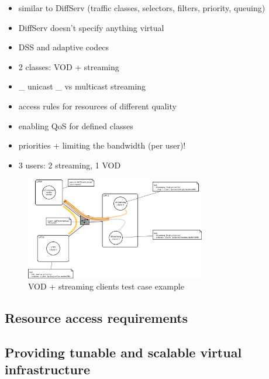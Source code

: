 \documentclass[11pt]{book}
\begin{document}
        \begin{itemize}
          \item similar to DiffServ (traffic classes, selectors, filters, priority, queuing)
          \item DiffServ doesn't specify anything virtual
          \item DSS and adaptive codecs
        \end{itemize}

        \begin{itemize}
          \item 2 classes: VOD + streaming
          \item \_ unicast \_ vs multicast streaming
          \item access rules for resources of different quality
          \item enabling QoS for defined classes
          \item priorities + limiting the bandwidth (per user)!
          \item 3 users: 2 streaming, 1 VOD
        \end{itemize}

        \begin{figure}[H]
                   \begin{center}
                         \includegraphics[width=0.7\textwidth]{img/test-case/diagram.png}
                         \caption{VOD + streaming clients test case example}
                   \end{center}
        \end{figure}


      \subsection{Resource access requirements}

      \subsection{Providing tunable and scalable virtual infrastructure}
\end{document}
